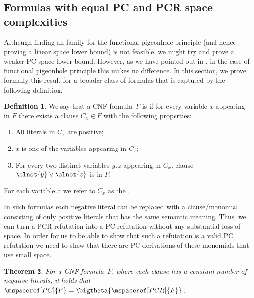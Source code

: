 \documentclass[11pt]{article}
\numberwithin{equation}{section}
\newtheorem{theorem}{Theorem}[section]
\theoremstyle{definition}
\newtheorem{definition}[theorem]{Definition}
\theoremstyle{plain}
\begin{document}
\subsection{Formulas with equal PC and PCR space complexities}
\label{sec:varweightconstrained}


Although finding an \kextendible{} family for the functional
pigeonhole principle (and hence proving a linear space lower bound) is not
feasible, we might try and prove a weaker PC space lower
bound. However, as we have pointed out in
, in the case of functional pigeonhole
principle this makes no difference. In this section, we prove formally
this result for a broader class of formulas that is captured by the
following definition.

\begin{definition}\label{def:var-weight-constrained}
  We say that a CNF formula~$F$ is
  \introduceterm{\varweightconstrained{}} if for every variable $x$
  appearing in $F$ there exists a clause $C_x \in F$ with the
  following properties:
  \begin{enumerate}
  \item All literals in $C_x$ are positive;
  \item $x$ is one of the variables appearing in $C_x$;
  \item For every two distinct variables $y, z$ appearing in $C_x$,
    clause $\olnot{y} \lor \olnot{z}$ is in $F$.
  \end{enumerate}
  For each variable $x$ we refer to $C_x$ as the
  .
\end{definition}

In such formulas each negative literal can be replaced with a
clause/monomial consisting of only positive literals that has the same
semantic meaning. Thus, we can turn a PCR refutation into a PC
refutation without any substantial loss of space. In order for us to
be able to show that such a refutation is a valid PC refutation we
need to show that there are PC derivations of these monomials that use
small space.

\begin{theorem}\label{th:varweightconstrained}
  For a \varweightconstrained{} CNF formula~$F$, where each clause has
  a constant number of negative literals, it holds that
  $\mspaceref[PC]{F} = \bigtheta{\mspaceref[PCR]{F}}$.
\end{theorem}

%
\end{document}
